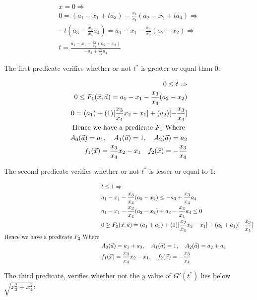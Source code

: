 \documentclass[UKenglish]{lipics-v2019}
\begin{document}
\begin{align*}
    x = 0 \Rightarrow \\
    0 = (a_1 - x_1 + t a_3) - \frac{x_3}{x_4}(a_2 - x_2 + t a_4 )   \Rightarrow \\
    - t ( a_3 -  \frac{x_3}{x_4} a_4) = a_1 - x_1 - \frac{x_3}{x_4} (a_2 - x_2) \Rightarrow \\
    t = \frac{   a_1 - x_1 - \frac{x_3}{x_4} (a_2 - x_2)}{ - a_3 + \frac{x_3}{x_4}a_4}
\end{align*}

The first predicate verifies whether or not $t^*$ is greater or equal than $0$:

\begin{align*}
    0 \le t \Rightarrow \\
   0 \le F_1(\vec{x}, \vec{a}) = a_1 - x_1 - \frac{x_3}{x_4} (a_2 - x_2)  \\
    0 = (a_1) + (1)[\frac{x_3}{x_4}x_2 - x_1] + (a_2) [ - \frac{x_3}{x_4} ] \\
    \textnormal{Hence we have a predicate } F_1 \textnormal{ Where }\\
    A_0(\vec{a}) = a_1, \quad A_1(\vec{a}) = 1,\quad A_2(\vec{a}) = a_2 \\
    f_1(\vec{x}) = \frac{x_3}{x_4}x_2 - x_1 \quad f_2(\vec{x}) = - \frac{x_3}{x_4}
\end{align*}

The second predicate verifies whether or not $t^*$ is lesser or equal to $1$:

\begin{align*}
    &t \le 1 \Rightarrow \\
    & a_1 - x_1 - \frac{x_3}{x_4} (a_2 - x_2) \le  - a_3 + \frac{x_3}{x_4}a_4 \\
    & a_1 - x_1 - \frac{x_3}{x_4} (a_2 - x_2) + a_3 - \frac{x_3}{x_4}a_4 \le 0 \\
    &0 \ge F_2(\vec{x}, \vec{a}) = (a_1 + a_3) + (1)[\frac{x_3}{x_4}x_2- x_1] + (a_2 + a_4) [ - \frac{x_3}{x_4} ] \\
    \textnormal{Hence we have a predicate } F_2 \textnormal{ Where } \\
    &A_0(\vec{a}) = a_1 + a_3, \quad A_1(\vec{a}) = 1,\quad A_2(\vec{a}) = a_2 + a_4 \\
    &f_1(\vec{x}) = \frac{x_3}{x_4}x_2- x_1,\quad f_2(\vec{x}) = - \frac{x_3}{x_4}
\end{align*}

The third predicate, verifies whether not the $y$ value of $G'(t^*)$ lies below $\sqrt{x_3^2 + x_4^2}$:
\end{document}
